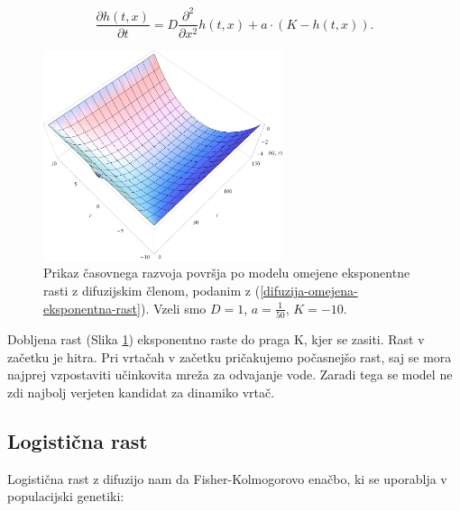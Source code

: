\documentclass[a4paper, twoside, 12pt]{book}
\begin{document}
    \begin{equation}
      \frac{ \partial h(t,x) }{ \partial t} = D \frac{\partial^2}{\partial x^2} h(t,x) + a \cdot (K - h(t,x)).
      \label{difuzija-omejena-eksponentna-rast}
    \end{equation}
    \begin{figure}[h]
      \begin{center}
        \includegraphics[width=7cm]{slike/difuzija-omejena-eksponentna-rast2}
      \end{center}
      \caption{Prikaz časovnega razvoja površja po modelu omejene eksponentne rasti z difuzijskim členom, podanim z (\ref{difuzija-omejena-eksponentna-rast}). Vzeli smo $D=1$, $a=\frac{1}{50}$, $K=-10$.}
      \label{fig:difuzija-omejena-eksponentna-rast}
    \end{figure}

    Dobljena rast (Slika \ref{fig:difuzija-omejena-eksponentna-rast}) eksponentno raste do praga K, kjer se zasiti. Rast v začetku je hitra. Pri vrtačah v začetku pričakujemo počasnejšo rast, saj se mora najprej vzpostaviti učinkovita mreža za odvajanje vode. Zaradi tega se model ne zdi najbolj verjeten kandidat za dinamiko vrtač.


    \subsection{Logistična rast}
Logistična rast z difuzijo nam da Fisher-Kolmogorovo enačbo, ki se uporablja v populacijski genetiki:
\end{document}

